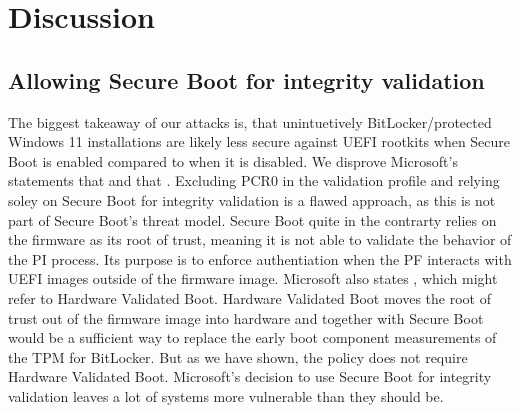 


\chapter{Discussion}

\section*{Allowing Secure Boot for integrity validation}

The biggest takeaway of our attacks is, that unintuetively BitLocker\-/protected Windows 11 installations are likely less secure against \ac{UEFI} rootkits when Secure Boot is enabled compared to when it is disabled.
We disprove Microsoft's statements that  and that .
Excluding \ac{PCR}0 in the validation profile and relying soley on Secure Boot for integrity validation is a flawed approach, as this is not part of Secure Boot's threat model.
Secure Boot quite in the contrarty relies on the firmware as its root of trust, meaning it is not able to validate the behavior of the \ac{PI} process.
Its purpose is to enforce authentiation when the \ac{PF} interacts with \ac{UEFI} images outside of the firmware image.
Microsoft also states , which might refer to Hardware Validated Boot.
Hardware Validated Boot moves the root of trust out of the firmware image into hardware and together with Secure Boot would be a sufficient way to replace the early boot component measurements of the \ac{TPM} for BitLocker.
But as we have shown, the policy does not require Hardware Validated Boot.
Microsoft's decision to use Secure Boot for integrity validation leaves a lot of systems more vulnerable than they should be.
